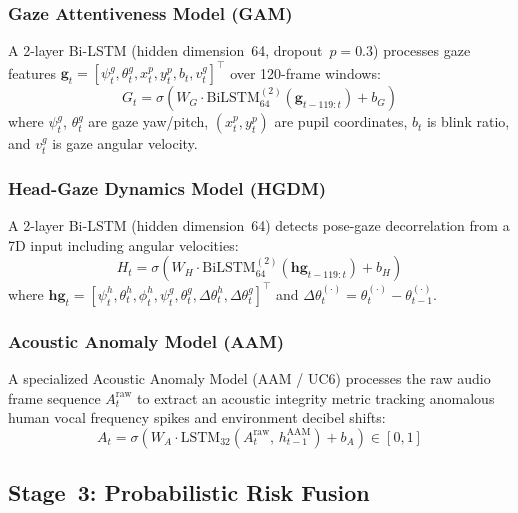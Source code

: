 \documentclass[journal]{IEEEtran}
\begin{document}
\subsubsection{Gaze Attentiveness Model (GAM)}
A 2-layer Bi-LSTM (hidden dimension~64, dropout~$p{=}0.3$) processes gaze features $\mathbf{g}_t = [\psi_t^g, \theta_t^g, x_t^p, y_t^p, b_t, v_t^g]^\top$ over 120-frame windows:
\begin{equation}
    G_t = \sigma\!\left(W_G \cdot \mathrm{BiLSTM}_{64}^{(2)}(\mathbf{g}_{t-119:t}) + b_G\right)
    \label{eq:gam}
\end{equation}
where $\psi_t^g$, $\theta_t^g$ are gaze yaw/pitch, $(x_t^p, y_t^p)$ are pupil coordinates, $b_t$ is blink ratio, and $v_t^g$ is gaze angular velocity.

\subsubsection{Head-Gaze Dynamics Model (HGDM)}
A 2-layer Bi-LSTM (hidden dimension~64) detects pose-gaze decorrelation from a 7D input including angular velocities:
\begin{equation}
    H_t = \sigma\!\left(W_H \cdot \mathrm{BiLSTM}_{64}^{(2)}(\mathbf{hg}_{t-119:t}) + b_H\right)
    \label{eq:hgdm}
\end{equation}
where $\mathbf{hg}_t = [\psi_t^h, \theta_t^h, \phi_t^h, \psi_t^g, \theta_t^g, \Delta\theta_t^h, \Delta\theta_t^g]^\top$ and $\Delta\theta_t^{(\cdot)} = \theta_t^{(\cdot)} - \theta_{t-1}^{(\cdot)}$.

\subsubsection{Acoustic Anomaly Model (AAM)}
A specialized Acoustic Anomaly Model (AAM / UC6) processes the raw audio frame sequence $A_t^{\mathrm{raw}}$ to extract an acoustic integrity metric tracking anomalous human vocal frequency spikes and environment decibel shifts:
\begin{equation}
    A_t = \sigma\!\left(W_A \cdot \mathrm{LSTM}_{32}(A_t^{\mathrm{raw}},\, h_{t-1}^{\mathrm{AAM}}) + b_A\right) \in [0,1]
    \label{eq:aam}
\end{equation}

\subsection{Stage~3: Probabilistic Risk Fusion}
\end{document}
